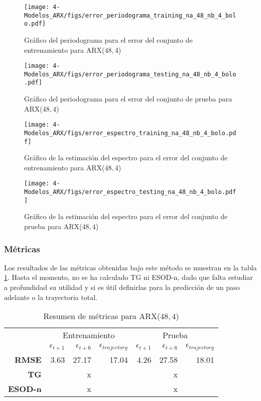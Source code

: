 \begin{figure}[H]
	\centering
	\texttt{[image: 4-Modelos\_ARX/figs/error\_periodograma\_training\_na\_48\_nb\_4\_bolo.pdf]}
	\caption{Gráfico del periodograma para el error del conjunto de entrenamiento para ARX($48, 4$)}
	\label{fig:M4_error_periodograma_train_bolo}
\end{figure}

\begin{figure}[H]
	\centering
	\texttt{[image: 4-Modelos\_ARX/figs/error\_periodograma\_testing\_na\_48\_nb\_4\_bolo.pdf]}
	\caption{Gráfico del periodograma para el error del conjunto de prueba para ARX($48, 4$)}
	\label{fig:M4_error_periodograma_test_bolo}
\end{figure}

\begin{figure}[H]
	\centering
	\texttt{[image: 4-Modelos\_ARX/figs/error\_espectro\_training\_na\_48\_nb\_4\_bolo.pdf]}
	\caption{Gráfico de la estimación del espectro para el error del conjunto de entrenamiento para ARX($48, 4$)}
	\label{fig:M4_error_espectro_train_bolo}
\end{figure}

\begin{figure}[H]
	\centering
	\texttt{[image: 4-Modelos\_ARX/figs/error\_espectro\_testing\_na\_48\_nb\_4\_bolo.pdf]}
	\caption{Gráfico de la estimación del espectro para el error del conjunto de prueba para ARX($48, 4$)}
	\label{fig:M4_error_espectro_test_bolo}
\end{figure}

\subsubsection*{Métricas}

Los resultados de las métricas obtenidas bajo este método se muestran en la tabla \ref{table:M4_metricas_bolo}. Hasta el momento, no se ha calculado TG ni ESOD-n, dado que falta estudiar a profundidad su utilidad y si es útil definirlas para la predicción de un paso adelante o la trayectoria total.

\begin{table}[H]
	\centering
	\begin{tabular}{rrrr|rrr}
		\hline \hline
		& \multicolumn{3}{c|}{Entrenamiento} & \multicolumn{3}{c}{Prueba} \\
		& $\epsilon_{t+1}$ & $\epsilon_{t+6}$ &$\epsilon_{trajectory}$ & $\epsilon_{t+1}$  & $\epsilon_{t+6}$ & $\epsilon_{trajectory}$ \\ \hline
		\textbf{RMSE}   & 3.63 & 27.17 & 17.04 & 4.26 & 27.58 & 18.01 \\
		\textbf{TG}     &      & x     &       &      & x     &       \\
		\textbf{ESOD-n} &      & x     &       &      & x     &       \\ 
		\hline \hline
	\end{tabular}
	\caption{Resumen de métricas para ARX($48, 4$)}
	\label{table:M4_metricas_bolo}
\end{table}

